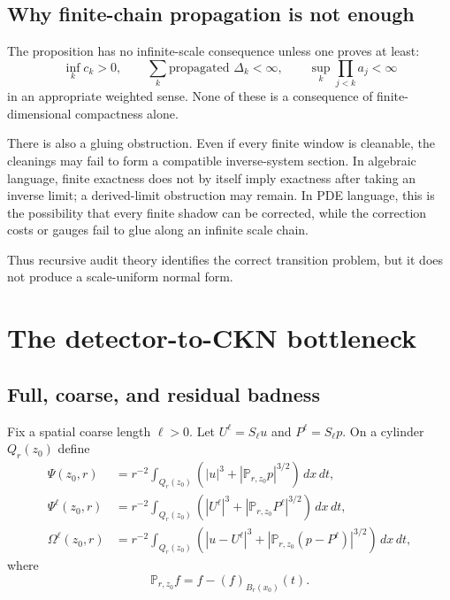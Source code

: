 \documentclass[11pt]{article}
\numberwithin{equation}{section}
\theoremstyle{remark}
\newcommand{\dxdt}{\,dx\,dt}
\begin{document}
\subsection{Why finite-chain propagation is not enough}

The proposition has no infinite-scale consequence unless one proves at least:
\begin{equation}\label{eq:recursive-needs}
\inf_k c_k>0,
\qquad
\sum_k\text{propagated }\Delta_k<\infty,
\qquad
\sup_k\prod_{j<k}a_j<\infty
\end{equation}
in an appropriate weighted sense. None of these is a consequence of finite-dimensional compactness alone.

There is also a gluing obstruction. Even if every finite window is cleanable, the cleanings may fail to form a compatible inverse-system section. In algebraic language, finite exactness does not by itself imply exactness after taking an inverse limit; a derived-limit obstruction may remain. In PDE language, this is the possibility that every finite shadow can be corrected, while the correction costs or gauges fail to glue along an infinite scale chain.

Thus recursive audit theory identifies the correct transition problem, but it does not produce a scale-uniform normal form.

\section{The detector-to-CKN bottleneck}\label{sec:bottleneck}

\subsection{Full, coarse, and residual badness}

Fix a spatial coarse length $\ell>0$. Let $U^\ell=S_\ell u$ and $P^\ell=S_\ell p$. On a cylinder $Q_r(z_0)$ define
\begin{align}
\Psi(z_0,r)
&=r^{-2}\int_{Q_r(z_0)}
\left(|u|^3+|\mathbb P_{r,z_0}p|^{3/2}\right)\dxdt,\label{eq:full-badness}\\
\Psi^\ell(z_0,r)
&=r^{-2}\int_{Q_r(z_0)}
\left(|U^\ell|^3+|\mathbb P_{r,z_0}P^\ell|^{3/2}\right)\dxdt,\label{eq:coarse-badness}\\
\Omega^\ell(z_0,r)
&=r^{-2}\int_{Q_r(z_0)}
\left(|u-U^\ell|^3+
|\mathbb P_{r,z_0}(p-P^\ell)|^{3/2}\right)\dxdt,
\label{eq:residual-badness}
\end{align}
where
\[
\mathbb P_{r,z_0}f=f-(f)_{B_r(x_0)}(t).
\]
\end{document}
